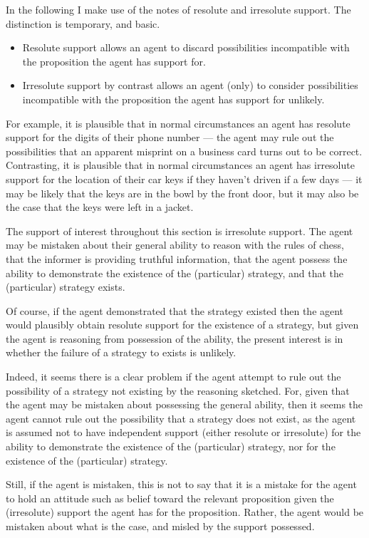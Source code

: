 \documentclass[10pt]{article}
\begin{document}
{\color{red}
\begin{note}
  In the following I make use of the notes of resolute and irresolute support.
  The distinction is temporary, and basic.
  \begin{itemize}
  \item Resolute support allows an agent to discard possibilities incompatible with the proposition the agent has support for.
  \item Irresolute support by contrast allows an agent (only) to consider possibilities incompatible with the proposition the agent has support for unlikely.
  \end{itemize}
  For example, it is plausible that in normal circumstances an agent has resolute support for the digits of their phone number --- the agent may rule out the possibilities that an apparent misprint on a business card turns out to be correct.
  Contrasting, it is plausible that in normal circumstances an agent has irresolute support for the location of their car keys if they haven't driven if a few days --- it may be likely that the keys are in the bowl by the front door, but it may also be the case that the keys were left in a jacket.

  The support of interest throughout this section is irresolute support.
  The agent may be mistaken about their general ability to reason with the rules of chess, that the informer is providing truthful information, that the agent possess the ability to demonstrate the existence of the (particular) strategy, and that the (particular) strategy exists.

  Of course, if the agent demonstrated that the strategy existed then the agent would plausibly obtain resolute support for the existence of a strategy, but given the agent is reasoning from possession of the ability, the present interest is in whether the failure of a strategy to exists is unlikely.
\end{note}

\begin{note}
  Indeed, it seems there is a clear problem if the agent attempt to rule out the possibility of a strategy not existing by the reasoning sketched.
  For, given that the agent may be mistaken about possessing the general ability, then it seems the agent cannot rule out the possibility that a strategy does not exist, as the agent is assumed not to have independent support (either resolute or irresolute) for the ability to demonstrate the existence of the (particular) strategy, nor for the existence of the (particular) strategy.

  Still, if the agent is mistaken, this is not to say that it is a mistake for the agent to hold an attitude such as belief toward the relevant proposition given the (irresolute) support the agent has for the proposition.
  Rather, the agent would be mistaken about what is the case, and misled by the support possessed.
\end{note}
}
\end{document}
